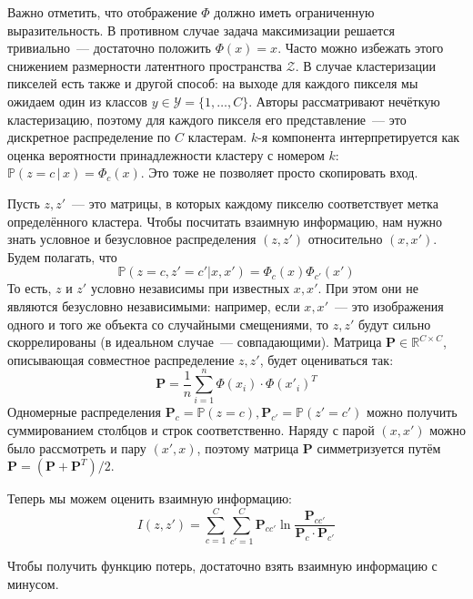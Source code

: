     Важно отметить, что отображение $\Phi$ должно иметь ограниченную выразительность.
    В противном случае задача максимизации решается тривиально~--- достаточно положить $\Phi(x) = x$.
    Часто можно избежать этого снижением размерности латентного пространства $\mathcal{Z}$.
    В случае кластеризации пикселей есть также и другой способ: на выходе для каждого пикселя мы ожидаем один из классов $y \in \mathcal{Y} = \{1, \ldots, C\}$.
    Авторы рассматривают нечёткую кластеризацию, поэтому для каждого пикселя его представление~--- это дискретное распределение по $C$ кластерам.
    $k$-я компонента интерпретируется как оценка вероятности принадлежности кластеру с номером $k$: $\mathbb{P}(z = c \, | \, x) = \Phi_c(x)$.
    Это тоже не позволяет просто скопировать вход.

    Пусть $z, z'$~--- это матрицы, в которых каждому пикселю соответствует метка определённого кластера. 
    Чтобы посчитать взаимную информацию, нам нужно знать условное и безусловное распределения $(z, z')$ относительно $(x, x')$.
    Будем полагать, что
    \begin{equation}
        \mathbb{P}\left(z = c, z' = c' | x, x' \right) = \Phi_c(x) \Phi_{c'}(x')
    \end{equation}
    То есть, $z$ и $z'$ условно независимы при известных $x, x'$.
    При этом они не являются безусловно независимыми: например, если $x, x'$~--- 
    это изображения одного и того же объекта со случайными смещениями, то $z, z'$
    будут сильно скоррелированы (в идеальном случае~--- совпадающими).
    Матрица $\bm{P} \in \mathbb{R}^{C \times C}$, описывающая совместное распределение $z, z'$, будет оцениваться так:
    \begin{equation}
        \bm{P} = \frac{1}{n} \sum_{i=1}^{n} \Phi(x_i) \cdot \Phi(x'_i)^T
    \end{equation}
    Одномерные распределения $\bm{P}_c = \mathbb{P}(z = c), \bm{P}_{c'} = \mathbb{P}(z' = c')$ можно получить суммированием столбцов и строк соответственно.
    Наряду с парой $(x, x')$ можно было рассмотреть и пару $(x', x)$, поэтому матрица $\bm{P}$ симметризуется путём $\bm{P} = (\bm{P} + \bm{P}^T) / 2$.
    
    Теперь мы можем оценить взаимную информацию:
    \begin{equation}
        I(z, z') = \sum_{c=1}^{C} \sum_{c'=1}^{C} \bm{P}_{cc'} \ln \frac{\bm{P}_{cc'}}{\bm{P}_{c} \cdot \bm{P}_{c'}}
    \end{equation}

    Чтобы получить функцию потерь, достаточно взять взаимную информацию с минусом.

